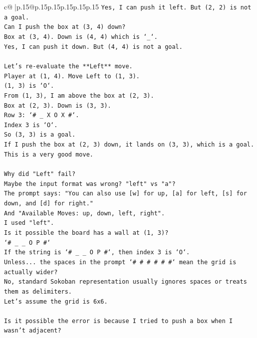 \documentclass{article}
\begin{document}
{\begin{supertabular}{c@{$\;$}|p{.15\linewidth}@{}p{.15\linewidth}p{.15\linewidth}p{.15\linewidth}p{.15\linewidth}p{.15\linewidth}}
{{{\texttt{Yes, I can push it left. But (2, 2) is not a goal.} \\
\texttt{Can I push the box at (3, 4) down?} \\
\texttt{Box at (3, 4). Down is (4, 4) which is `\_`.} \\
\texttt{Yes, I can push it down. But (4, 4) is not a goal.} \\
\\ 
\texttt{Let's re{-}evaluate the **Left** move.} \\
\texttt{Player at (1, 4). Move Left to (1, 3).} \\
\texttt{(1, 3) is `O`.} \\
\texttt{From (1, 3), I am above the box at (2, 3).} \\
\texttt{Box at (2, 3). Down is (3, 3).} \\
\texttt{Row 3: `\# \_ X O X \#`.} \\
\texttt{Index 3 is `O`.} \\
\texttt{So (3, 3) is a goal.} \\
\texttt{If I push the box at (2, 3) down, it lands on (3, 3), which is a goal.} \\
\texttt{This is a very good move.} \\
\\ 
\texttt{Why did "Left" fail?} \\
\texttt{Maybe the input format was wrong? "left" vs "a"?} \\
\texttt{The prompt says: "You can also use {[}w{]} for up, {[}a{]} for left, {[}s{]} for down, and {[}d{]} for right."} \\
\texttt{And "Available Moves: up, down, left, right".} \\
\texttt{I used "left".} \\
\texttt{Is it possible the board has a wall at (1, 3)?} \\
\texttt{`\# \_ \_ O P \#`} \\
\texttt{If the string is `\# \_ \_ O P \#`, then index 3 is `O`.} \\
\texttt{Unless... the spaces in the prompt `\# \# \# \# \# \#` mean the grid is actually wider?} \\
\texttt{No, standard Sokoban representation usually ignores spaces or treats them as delimiters.} \\
\texttt{Let's assume the grid is 6x6.} \\
\\ 
\texttt{Is it possible the error is because I tried to push a box when I wasn't adjacent?} \\
}}}
\end{supertabular}}
\end{document}
